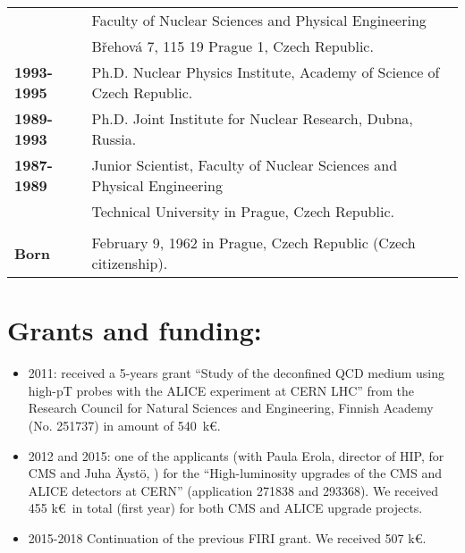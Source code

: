 \documentclass[12pt]{article}
\begin{document}
\begin{tabular}{ll}
				& Faculty of Nuclear Sciences and Physical Engineering \\
				& B\v{r}ehov\'a 7, 115 19 Prague 1, Czech Republic.\\
{\bf 1993-1995} 	& Ph.D. Nuclear Physics Institute, Academy of Science of Czech Republic.\\
{\bf 1989-1993} 	& Ph.D. Joint Institute for Nuclear Research, Dubna, Russia.\\
{\bf 1987-1989} 	& Junior Scientist, Faculty of Nuclear Sciences and Physical Engineering\\
				& Technical University in Prague, Czech Republic.\\
\\
{\bf Born} 	& February 9, 1962 in Prague, Czech Republic (Czech citizenship).\\
				
\end{tabular}


\clearpage

\section{Grants and funding:}
\begin{itemize}
\item 2011: received a 5-years grant ``Study of the deconfined QCD medium using high-pT probes with the ALICE experiment at
CERN LHC'' from the Research Council for Natural Sciences and Engineering, Finnish Academy 
(No. 251737) in amount of 540~k\euro. 

\item 2012 and 2015: one of the applicants (with Paula Erola, director of HIP, for CMS and Juha \"Ayst\"o, ) for the ``High-luminosity upgrades of the CMS and ALICE detectors at CERN'' (application 271838 and 293368). We received 455 k\euro\ in total (first year) for both CMS and ALICE upgrade projects. 

\item 2015-2018 Continuation of the previous FIRI grant. We received 507 k\euro.
\end{itemize}
\end{document}
